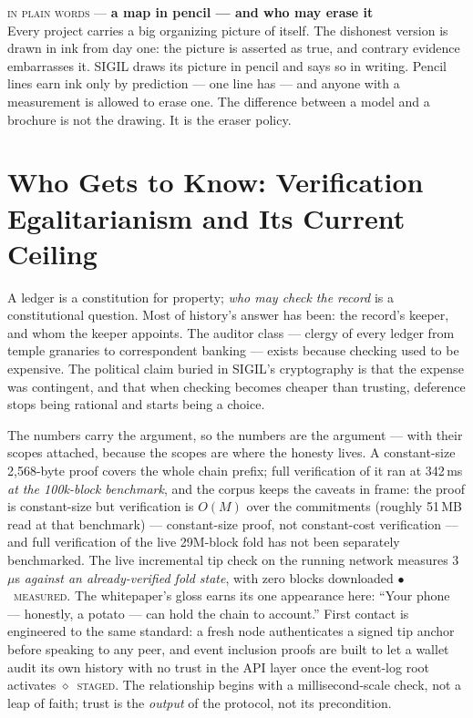 \documentclass[10pt,a4paper]{article}
\newcommand{\stM}{\textcolor{sigilcyan}{$\bullet$}~{\scriptsize\textcolor{sigilcyan}{\textsc{measured}}}}
\newcommand{\stG}{\textcolor{sigilviolet}{$\diamond$}~{\scriptsize\textcolor{sigilviolet}{\textsc{staged}}}}
\newcommand{\layman}[3]{%
\begin{tcolorbox}[enhanced,
  interior style={left color=#1!9,right color=white},
  colframe=#1!45!slate,boxrule=0.5pt,arc=3pt,
  borderline west={2.5pt}{0pt}{#1},
  left=9pt,right=9pt,top=7pt,bottom=7pt]
{\scriptsize\textcolor{#1}{\textsc{in plain words}}\; — \;\textbf{\small #2}}\\[3pt]
\small #3
\end{tcolorbox}}
\begin{document}
\layman{sigilviolet}{a map in pencil — and who may erase it}{Every project carries
a big organizing picture of itself. The dishonest version is drawn in ink from day
one: the picture is asserted as true, and contrary evidence embarrasses it. SIGIL
draws its picture in pencil and says so in writing. Pencil lines earn ink only by
prediction — one line has — and anyone with a measurement is allowed to erase one.
The difference between a model and a brochure is not the drawing. It is the
eraser policy.}

\section{Who Gets to Know: Verification Egalitarianism and Its Current Ceiling}\label{sec:whoknows}

A ledger is a constitution for property; \emph{who may check the record} is a
constitutional question. Most of history's answer has been: the record's keeper,
and whom the keeper appoints. The auditor class — clergy of every ledger from
temple granaries to correspondent banking — exists because checking used to be
expensive. The political claim buried in SIGIL's cryptography is that the expense
was contingent, and that when checking becomes cheaper than trusting, deference
stops being rational and starts being a choice.

The numbers carry the argument, so the numbers are the argument — with their
scopes attached, because the scopes are where the honesty lives. A constant-size
2{,}568-byte proof covers the whole chain prefix; full verification of it ran at
342\,ms \emph{at the 100k-block benchmark}, and the corpus keeps the caveats in
frame: the proof is constant-size but verification is $O(M)$ over the commitments
(roughly 51\,MB read at that benchmark) — constant-size proof, not constant-cost
verification — and full verification of the live 29M-block fold has not been
separately benchmarked. The live incremental tip check on the running network
measures 3\,$\mu$s \emph{against an already-verified fold state}, with zero blocks
downloaded \stM. The whitepaper's
gloss earns its one appearance here: ``Your phone — honestly, a potato — can hold
the chain to account.'' First contact is engineered to the same standard: a fresh
node authenticates a signed tip anchor before speaking to any peer, and event
inclusion proofs are built to let a wallet audit its own history with no trust in
the API layer once the event-log root activates \stG. The relationship begins
with a millisecond-scale check, not a leap of faith; trust is the \emph{output} of the protocol, not its precondition.
\end{document}
